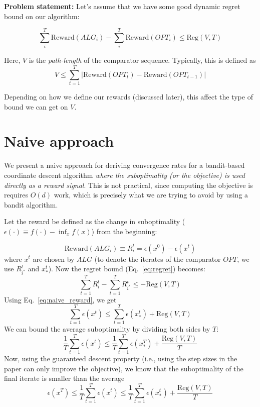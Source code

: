 \documentclass[letterpaper]{article}
\newcommand{\istar}{i^*}
\begin{document}
\textbf{Problem statement:} Let's assume that we have some good dynamic regret bound on our algorithm:

\begin{equation}
    \sum_i^T\text{Reward}(ALG_i) - \sum_i^T \text{Reward}(OPT_i) \leq \text{Reg}(V, T)
    \label{eq:regret}
\end{equation}

Here, $V$ is the \emph{path-length} of the comparator sequence. Typically, this is defined as
\begin{equation}
    V \leq \sum_{t=1}^T |\text{Reward}(OPT_t) - \text{Reward}(OPT_{t-1})|
\end{equation}

Depending on how we define our rewards (discussed later), this affect the type of bound we can get on $V$.

\section{Naive approach}
We present a naive approach for deriving convergence rates for a bandit-based coordinate descent algorithm \emph{where the suboptimality (or the objective) is used directly as a reward signal}. This is not practical, since computing the objective is requires $O(d)$ work, which is precisely what we are trying to avoid by using a bandit algorithm.

Let the reward be defined as the change in suboptimality ($\epsilon(\cdot)\equiv f(\cdot) - \inf_x f(x)$) from the beginning:

\begin{equation}
    \text{Reward}(ALG_i) \equiv R^t_i = \epsilon(x^0) - \epsilon(x^t)
    \label{eq:naive_reward}
\end{equation}
where $x^t$ are chosen by $ALG$ (to denote the iterates of the comparator $OPT$, we use $R^t_{\istar}$ and $x_*^t$).
Now the regret bound (Eq.~\ref{eq:regret}) becomes:
\begin{equation}
    \sum_{t=1}^T R_{i}^t - \sum_{t=1}^T R_{\istar}^t \leq -\text{Reg}(V,T)
\end{equation}
Using Eq.~\ref{eq:naive_reward}, we get
\begin{equation}
    \sum_{t=1}^T \epsilon(x^t) \leq \sum_{t=1}^T \epsilon(x^t_*) + \text{Reg}(V,T)
\end{equation}
We can bound the average suboptimality by dividing both sides by $T$:
\begin{equation}
    \frac{1}{T}\sum_{t=1}^T \epsilon(x^t) \leq \frac{1}{T} \sum_{t=1}^T \epsilon (x^T_*) + \frac{\text{Reg}(V,T)}{T}
\end{equation}
Now, using the guaranteed descent property (i.e., using the step sizes in the paper can only improve the objective), we know that the suboptimality of the final iterate is smaller than the average
\begin{equation}
    \epsilon(x^T) \leq \frac{1}{T}\sum_{t=1}^T \epsilon(x^t) \leq \frac{1}{T} \sum_{t=1}^T \epsilon(x_*^t) + \frac{\text{Reg}(V,T)}{T}
    \label{eq:naive_average_regret}
\end{equation}
\end{document}

